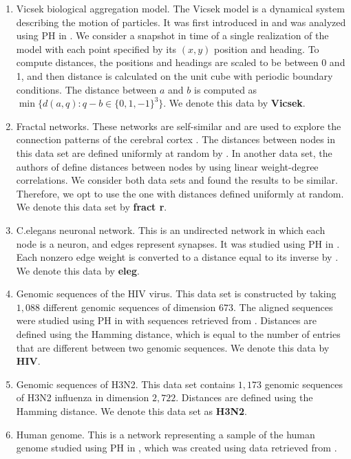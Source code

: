 \documentclass[11pt,onecolumn]{article}
\theoremstyle{plain}
\theoremstyle{definition}
\begin{document}
\begin{enumerate}
    \item Vicsek biological aggregation model. The Vicsek model is a dynamical system describing the motion of particles.  
    It was first introduced in \cite{vicsek} and was analyzed using PH in \cite{TZH15}. We consider a snapshot in time of a single realization of the model with each point specified by its $(x,y)$ position and heading. To compute distances, the positions and headings are scaled to be between 0 and 1, and then distance is calculated on the unit cube with periodic boundary conditions. The distance between $a$ and $b$ is computed as $\min \{d(a,q) : q-b \in \{0,1,-1\}^3 \}$. We denote this data by \textbf{Vicsek}.  
    \item Fractal networks. These networks are self-similar and are used to explore the connection patterns of the cerebral cortex \cite{fractr}. The distances between nodes in this data set are defined uniformly at random by \cite{roadmap2017}. In another data set, the authors of \cite{roadmap2017} define distances between nodes by using linear weight-degree correlations. We consider both data sets and found the results to be similar. Therefore, we opt to use the one with distances defined uniformly at random.  
    We denote this data set by \textbf{fract r}.  
    \item C.elegans neuronal network. This is an undirected network in which each node is a neuron, and edges represent synapses. It was studied using PH in \cite{celegans}. Each nonzero edge weight is converted to a distance equal to its inverse by \cite{roadmap2017}.  
    We denote this data by \textbf{eleg}. 
    \item Genomic sequences of the HIV virus. This data set is constructed by taking $1,088$ different genomic sequences of dimension $673$. The aligned sequences were studied using PH in \cite{hiv} with sequences retrieved from \cite{HIVdata}. Distances are defined using the Hamming distance, which is equal to the number of entries that are different between two genomic sequences. We denote this data by \textbf{HIV}. 
    \item Genomic sequences of H3N2. This data set contains $1,173$ genomic sequences of H3N2 influenza in dimension $2,722$. Distances are defined using the Hamming distance. We denote this data set as \textbf{H3N2}.   
    \item Human genome. This is a network representing a sample of the human genome studied using PH in \cite{celegans}, which was created using data retrieved from \cite{genome}. 

\end{enumerate}
\end{document}
